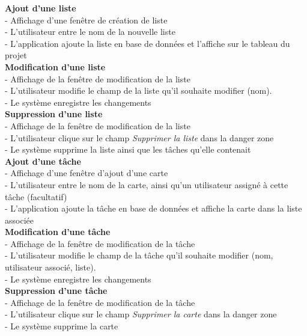 \documentclass[conference]{IEEEtran}
\begin{document}
\textbf{Ajout d'une liste}\\
- Affichage d'une fenêtre de création de liste\\
- L'utilisateur entre le nom de la nouvelle liste\\
- L'application ajoute la liste en base de données et l'affiche sur le tableau du projet\\

\textbf{Modification d'une liste}\\
- Affichage de la fenêtre de modification de la liste\\
- L'utilisateur modifie le champ de la liste qu'il souhaite modifier (nom).\\
- Le système enregistre les changements\\

\textbf{Suppression d'une liste}\\
- Affichage de la fenêtre de modification de la liste\\
- L'utilisateur clique sur le champ \textit{Supprimer la liste} dans la danger zone\\
- Le système supprime la liste ainsi que les tâches qu'elle contenait\\

\textbf{Ajout d'une tâche}\\
- Affichage d'une fenêtre d'ajout d'une carte\\
- L'utilisateur entre le nom de la carte, ainsi qu'un utilisateur assigné à cette tâche (facultatif)\\
- L'application ajoute la tâche en base de données et affiche la carte dans la liste associée\\

\textbf{Modification d'une tâche}\\
- Affichage de la fenêtre de modification de la tâche\\
- L'utilisateur modifie le champ de la tâche qu'il souhaite modifier (nom, utilisateur associé, liste).\\
- Le système enregistre les changements\\

\textbf{Suppression d'une tâche}\\
- Affichage de la fenêtre de modification de la tâche\\
- L'utilisateur clique sur le champ \textit{Supprimer la carte} dans la danger zone\\
- Le système supprime la carte\\
\end{document}
